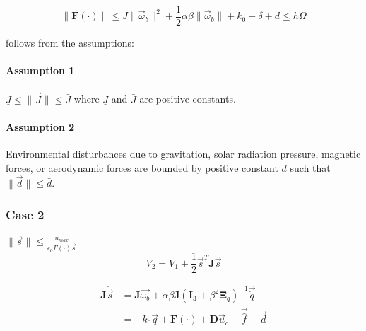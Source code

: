 \begin{equation}
    \lVert\mathbf{F}(\cdot)\rVert \leq \bar{J}\lVert\vec{\omega}_b\rVert^2 + \frac{1}{2}\alpha\beta\lVert\vec{\omega}_b\rVert + k_0 + \delta + \bar{d}	\leq h\Omega 
\end{equation}

follows from the assumptions:
\paragraph{Assumption 1} $\underline{J} \leq \lVert\vec{J}\rVert \leq \bar{J}$ where $\underline{J}$ and $\bar{J}$ are positive constants.

\paragraph{Assumption 2} Environmental disturbances due to gravitation, solar radiation pressure, magnetic forces, or aerodynamic forces are bounded by positive constant $\bar{d}$ such that $\lVert\vec{d}\rVert \leq \bar{d}$.


\subsubsection{Case 2} $\lVert \vec{s} \rVert \leq \frac{u_{max}}{\epsilon_0\Gamma(\cdot)\vec{s}}$
\begin{equation}
    V_2=V_1+\frac{1}{2}\vec{s}^T\mathbf{J}\vec{s}
\end{equation}

\begin{equation}
    \begin{split}
        \mathbf{J}\dot{\vec{s}}&=
        \mathbf{J}\dot{\vec{\omega_b}} + \alpha\beta\mathbf{J}(\mathbf{I_3}+\beta^2\mathbf{\Xi}_q)^{-1}\vec{\dot{q}}\\
        &=-k_0\vec{q}+\mathbf{F}(\cdot)+\mathbf{D}\vec{u}_{c}+\vec{\hat{f}}+\vec{d}
    \end{split}
\end{equation}